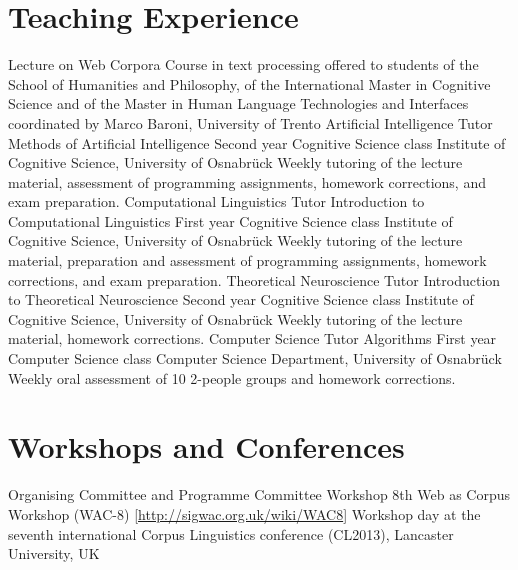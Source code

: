 \documentclass[11pt,a4paper]{moderncv}
\begin{document}
\section{Teaching Experience}
        {Lecture on Web Corpora}
        {Course in text processing}
        {offered to students of the School of Humanities and Philosophy, of the
        International Master in Cognitive Science and of the Master in Human
        Language Technologies and Interfaces}
        {coordinated by Marco Baroni, University of Trento}
        {}
        {Artificial Intelligence Tutor}
        {Methods of Artificial Intelligence}
        {Second year Cognitive Science class}
        {Institute of Cognitive Science, University of Osnabr\"{u}ck}
        {Weekly tutoring of the lecture material, assessment of programming
        assignments, homework corrections, and exam preparation.}	
        {Computational Linguistics Tutor}
        {Introduction to Computational Linguistics}
        {First year Cognitive Science class}
        {Institute of Cognitive Science, University of Osnabr\"{u}ck}
        {Weekly tutoring of the lecture material, preparation and assessment of
        programming assignments, homework corrections, and exam preparation.}
        {Theoretical Neuroscience Tutor}
        {Introduction to Theoretical Neuroscience}
        {Second year Cognitive Science class}
        {Institute of Cognitive Science, University of Osnabr\"{u}ck}
        {Weekly tutoring of the lecture material, homework corrections.}
        {Computer Science Tutor}
        {Algorithms}
        {First year Computer Science class}
        {Computer Science Department, University of Osnabr\"{u}ck}
        {Weekly oral assessment of 10 2-people groups and homework corrections.}
\closesection{}


\section{Workshops and Conferences}
        {Organising Committee and Programme Committee}
        {Workshop}
        {8th Web as Corpus Workshop (WAC-8)}
        {[\url{http://sigwac.org.uk/wiki/WAC8}]}
        {Workshop day at the seventh international Corpus Linguistics
        conference (CL2013), Lancaster University, UK}
\end{document}
